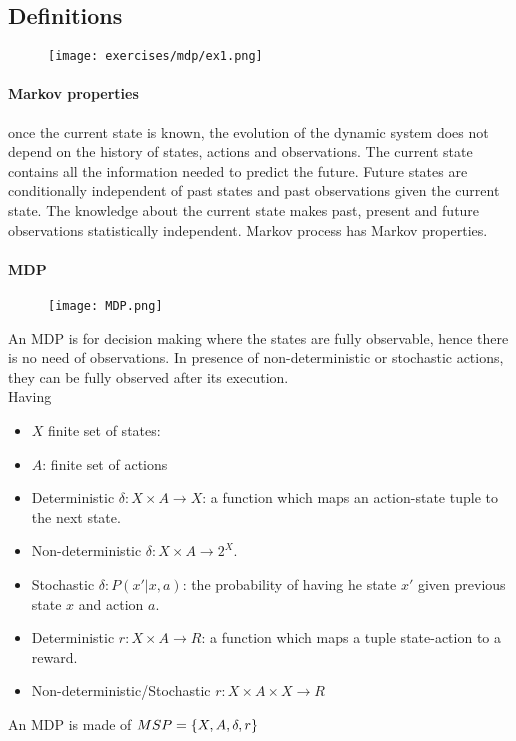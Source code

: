 \subsection{Definitions}

\begin{figure}[H]
    \centering
     \texttt{[image: exercises/mdp/ex1.png]}
\end{figure}

\paragraph{Markov properties} once the current state is known, the evolution of the dynamic system does not depend on the history of states, actions and observations. The current state contains all the information needed to predict the future. Future states are conditionally independent of past states and past observations given the current state. The knowledge about the current state makes past, present and future observations statistically independent. Markov process has Markov properties.\\


\paragraph{MDP}
\begin{figure}[H]
    \centering
    \texttt{[image: MDP.png]}
\end{figure}

An MDP is for decision making where the states are fully observable, hence there is  no need of observations. In presence of non-deterministic or stochastic actions, they can be fully observed after its execution.\\
Having 
\begin{itemize}
\item $X$ finite set of states:
\item $A$: finite set of actions
\item Deterministic $\delta: X\times A \rightarrow X$: a function which maps an action-state tuple to the next state.
\item Non-deterministic $\delta: X\times A \rightarrow 2^X$.
\item Stochastic $\delta: P(x'|x,a)$: the probability of having he state $x'$ given previous state $x$ and action $a$.
\item Deterministic $r:X\times A \rightarrow R$: a function which maps a tuple state-action to a reward.
\item Non-deterministic/Stochastic $r:X\times A \times X \rightarrow R$
\end{itemize}
An MDP is made of $MSP=\lbrace{X,A,\delta,r}\rbrace$

